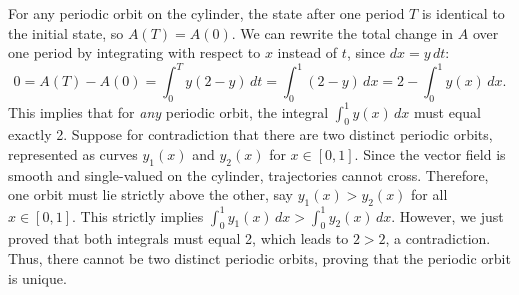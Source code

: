 \documentclass{article}
\begin{document}
\begin{enumerate}[label=\fbox{\arabic*}]
\begin{enumerate}[label=(\arabic*)]
\[          \]
          For any periodic orbit on the cylinder, the state after one period $T$ is identical to the initial state, so $A(T) = A(0)$. 
          We can rewrite the total change in $A$ over one period by integrating with respect to $x$ instead of $t$, since $dx = y \, dt$:
          \[
            0 = A(T) - A(0) = \int_0^T y(2-y) \, dt = \int_0^1 (2-y) \, dx = 2 - \int_0^1 y(x) \, dx.
          \]
          This implies that for \textit{any} periodic orbit, the integral $\int_0^1 y(x) \, dx$ must equal exactly 2.
          Suppose for contradiction that there are two distinct periodic orbits, represented as curves $y_1(x)$ and $y_2(x)$ for $x \in [0, 1]$. 
          Since the vector field is smooth and single-valued on the cylinder, trajectories cannot cross. Therefore, one orbit must lie strictly above the other, say $y_1(x) > y_2(x)$ for all $x \in [0, 1]$.
          This strictly implies $\int_0^1 y_1(x) \, dx > \int_0^1 y_2(x) \, dx$.
          However, we just proved that both integrals must equal 2, which leads to $2 > 2$, a contradiction.
          Thus, there cannot be two distinct periodic orbits, proving that the periodic orbit is unique.
        \end{enumerate}


\end{enumerate}
\end{document}
